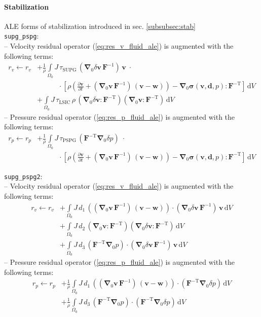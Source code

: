 \documentclass[a4paper,12pt]{report}
\newcommand{\bs}[1]{\boldsymbol{#1}}
\newcommand{\Om}{\mathit{\Omega}}
\begin{document}
\paragraph{Stabilization}
ALE forms of stabilization introduced in sec. \ref{subsubsec:stab}\\
\verb.supg_pspg.:\\
-- Velocity residual operator (\ref{eq:res_v_fluid_ale}) is augmented with the following terms:
\begin{align}
r_v \leftarrow r_v &+ \frac{1}{\rho}\int\limits_{\Om_0}J\, \tau_{\mathrm{SUPG}}\,(\bs{\nabla}_0\delta\bs{v}\,\bs{F}^{-1})\,\bs{v}\;\cdot \\
& \qquad\quad \cdot\left[\rho\left(\frac{\partial \bs{v}}{\partial t} + (\bs{\nabla}_0\bs{v}\,\bs{F}^{-1})\,(\bs{v}-\bs{w})\right) - \bs{\nabla}_{0} \bs{\sigma}(\bs{v},\bs{d},p) : \bs{F}^{-\mathrm{T}}\right]\,\mathrm{d}V \\
& + \int\limits_{\Om_0}J\, \tau_{\mathrm{LSIC}}\,\rho\,(\bs{\nabla}_{0}\delta\bs{v} : \bs{F}^{-\mathrm{T}})(\bs{\nabla}_{0}\bs{v} : \bs{F}^{-\mathrm{T}})\,\mathrm{d}V
\end{align}
-- Pressure residual operator (\ref{eq:res_p_fluid_ale}) is augmented with the following terms:
\begin{align}
r_p \leftarrow r_p &+ \frac{1}{\rho}\int\limits_{\Om_0}J\, \tau_{\mathrm{PSPG}}\,(\bs{F}^{-\mathrm{T}}\bs{\nabla}_{0}\delta p) \;\cdot \\
& \qquad\quad \cdot \left[\rho\left(\frac{\partial \bs{v}}{\partial t} + (\bs{\nabla}_0\bs{v}\,\bs{F}^{-1})\,(\bs{v}-\bs{w})\right) - \bs{\nabla}_{0} \bs{\sigma}(\bs{v},\bs{d},p) : \bs{F}^{-\mathrm{T}}\right]\,\mathrm{d}V
\end{align}

\verb.supg_pspg2.:\\
-- Velocity residual operator (\ref{eq:res_v_fluid_ale}) is augmented with the following terms:
\begin{align}
r_v \leftarrow r_v &+ \int\limits_{\Om_0} J\,d_1\,((\bs{\nabla}_{0}\bs{v}\,\bs{F}^{-1})\,(\bs{v}-\bs{w})) \cdot (\bs{\nabla}_{0}\delta\bs{v}\,\bs{F}^{-1})\,\bs{v}\,\mathrm{d}V \\
& + \int\limits_{\Om_0} J\,d_2\,(\bs{\nabla}_{0}\bs{v} : \bs{F}^{-\mathrm{T}}) (\bs{\nabla}_{0}\delta\bs{v} : \bs{F}^{-\mathrm{T}})\,\mathrm{d}V\\
&+ \int\limits_{\Om_0} J\,d_3\,(\bs{F}^{-\mathrm{T}}\bs{\nabla}_{0}p) \cdot (\bs{\nabla}_{0}\delta\bs{v}\,\bs{F}^{-1})\,\bs{v}\,\mathrm{d}V
\end{align}
-- Pressure residual operator (\ref{eq:res_p_fluid_ale}) is augmented with the following terms:
\begin{align}
r_p \leftarrow r_p &+ \frac{1}{\rho}\int\limits_{\Om_0} J\,d_1\,((\bs{\nabla}_{0}\bs{v}\,\bs{F}^{-1})\,(\bs{v}-\bs{w})) \cdot (\bs{F}^{-\mathrm{T}}\bs{\nabla}_{0}\delta p)\,\mathrm{d}V \\
&+ \frac{1}{\rho}\int\limits_{\Om_0} J\,d_3\,(\bs{F}^{-\mathrm{T}}\bs{\nabla}_{0}p) \cdot (\bs{F}^{-\mathrm{T}}\bs{\nabla}_{0}\delta p)\,\mathrm{d}V
\end{align}
\end{document}
